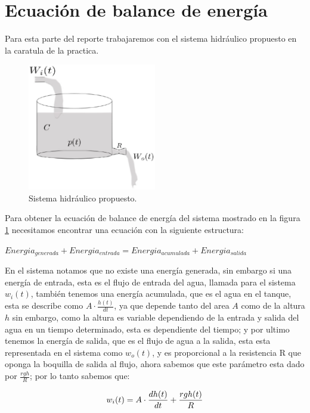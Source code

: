 \documentclass[letterpaper,spanish,12pt]{report}
\begin{document}
	\section{Ecuaci\'on de balance de energ\'ia}

Para esta parte del reporte trabajaremos con el sistema hidr\'aulico propuesto en la caratula de la practica.

\begin{figure}[h]
	\centering
		\includegraphics[width=0.50\textwidth]{tanque.eps}
	\caption{Sistema hidr\'aulico propuesto.}
	\label{fig:tanque}
\end{figure}

Para obtener la ecuaci\'on de balance de energ\'ia del sistema mostrado en la figura \ref{fig:tanque} necesitamos encontrar una ecuaci\'on con la siguiente estructura:
	\begin{center} $Energia_{generada} + Energia_{entrada} = Energia_{acumulada} + Energia_{salida}$ \end{center}
En el sistema notamos que no existe una energ\'ia generada, sin embargo si una energ\'ia de entrada, esta es el flujo de entrada del agua, llamada para el sistema $w_{i}(t)$, tambi\'en tenemos una energ\'ia acumulada, que es el agua en el tanque, esta se describe como $A \cdot \frac {h(t)} {dt} $, ya que depende tanto del area $A$ como de la altura $h$ sin embargo, como la altura es variable dependiendo de la entrada y salida del agua en un tiempo determinado, esta es dependiente del tiempo; y por ultimo tenemos la energ\'ia de salida, que es el flujo de agua a la salida, esta esta representada en el sistema como $w_{o}(t)$, y es proporcional a la resistencia R que oponga la boquilla de salida al flujo, ahora sabemos que este par\'ametro esta dado por $\frac {rgh} {R} $; por lo tanto sabemos que:

	\begin{equation}
		\centering
			w_{i}(t) = A \cdot \frac {dh(t)} {dt} + \frac {rgh(t)} {R}  
		\label{ec:6}
	\end{equation}
\end{document}
